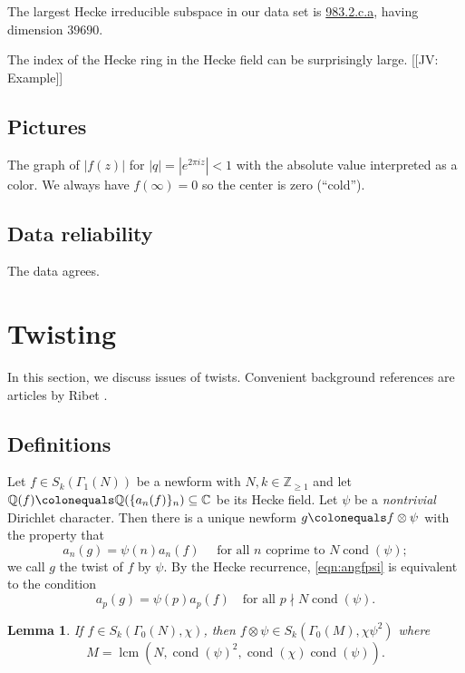 \documentclass[11pt]{amsart}
\numberwithin{equation}{subsection}
\theoremstyle{plain}
\newtheorem{lem}[equation]{Lemma}
\theoremstyle{definition}
\newcommand{\Q}{\mathbb{Q}}
\newcommand{\Z}{\mathbb{Z}}
\newcommand{\C}{\mathbb{C}}
\newcommand{\defi}[1]{\textsf{#1}} 	%
\DeclareMathOperator{\cond}{cond}
\DeclareMathOperator{\lcm}{lcm}
\newcommand{\jv}[1]{{\color{red} \textsf{[[JV: #1]]}}}
\begin{document}
The largest Hecke irreducible subspace in our data set is \href{http://cmfs.lmfdb.xyz/ModularForm/GL2/Q/holomorphic/983/2/c/a/}{\textsf{983.2.c.a}}, having dimension $39690$.

The index of the Hecke ring in the Hecke field can be surprisingly large.  \jv{Example}

\subsection{Pictures}

The graph of $\left|f(z)\right|$ for $\left|q\right|=\left|e^{2\pi iz}\right|<1$ with the absolute value interpreted as a color.  We always have $f(\infty)=0$ so the center is zero (``cold'').  

\subsection{Data reliability}

The data agrees.

\section{Twisting} \label{sec:twists}

In this section, we discuss issues of twists.  Convenient background references are articles by Ribet \cite{Ribet:galreps,Ribet:endos}.

\subsection{Definitions}

Let $f \in S_k(\Gamma_1(N))$ be a newform with $N,k \in \Z_{\geq 1}$ and let $\Q(f) \colonequals \Q(\{a_n(f)\}_n) \subseteq \C$ be its Hecke field.  Let $\psi$ be a \emph{nontrivial} Dirichlet character.  Then there is a unique newform $g \colonequals f \otimes \psi$ with the property that 
\begin{equation} \label{eqn:angfpsi}
a_n(g)=\psi(n)a_n(f) \quad \text{ for all $n$ coprime to $N\cond(\psi)$};
\end{equation}
we call $g$ the \defi{twist} of $f$ by $\psi$.  By the Hecke recurrence, \eqref{eqn:angfpsi} is equivalent to the condition 
\begin{equation}
a_p(g)=\psi(p)a_p(f) \quad \text{for all $p \nmid N\cond(\psi)$.}
\end{equation}

\begin{lem} \label{lem:MNchipsi}
If $f \in S_k(\Gamma_0(N),\chi)$, then $f \otimes \psi \in S_k(\Gamma_0(M),\chi\psi^2)$ where
\begin{equation} \label{eqn:MNpsi}
M = \lcm(N,\cond(\psi)^2,\cond(\chi)\cond(\psi)). 
\end{equation}
\end{lem}
\end{document}
